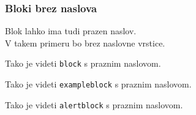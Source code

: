 \documentclass{beamer}
\begin{document}
\begin{frame}
   \frametitle{Bloki brez naslova}
   Blok lahko ima tudi prazen naslov.\\
   V takem primeru bo brez naslovne vrstice.
      \begin{block}{}Tako je videti \texttt{block} s praznim naslovom.\end{block}
      \begin{exampleblock}{}Tako je videti \texttt{exampleblock} s praznim naslovom.\end{exampleblock}
      \begin{alertblock}{}Tako je videti \texttt{alertblock} s praznim naslovom.\end{alertblock}
\end{frame}
\end{document}
